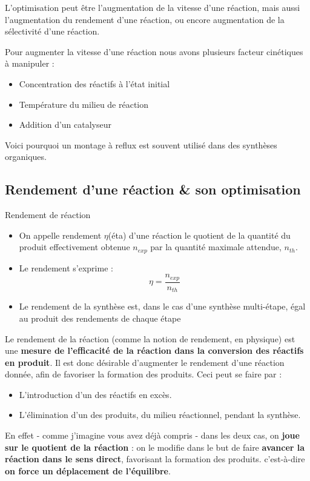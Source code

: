 \documentclass[11pt,a4paper]{article}
\begin{document}
L'optimisation peut être l'augmentation de la vitesse d'une réaction, mais aussi l'augmentation du rendement d'une réaction, ou encore augmentation de la sélectivité d'une réaction. 

Pour augmenter la vitesse d'une réaction nous avons plusieurs facteur cinétiques à manipuler : 
\begin{itemize}
    \item Concentration des réactifs à l'état initial
    \item Température du milieu de réaction
    \item Addition d'un catalyseur
\end{itemize}
Voici pourquoi un montage à reflux est souvent utilisé dans des synthèses organiques. 

\subsection{Rendement d'une réaction \& son optimisation}

\begin{defn}{Rendement de réaction }
\begin{itemize}
    \item On appelle rendement $\eta$(éta) d’une réaction le quotient de la quantité du produit effectivement obtenue $n_{exp}$  par la quantité maximale attendue, $n_{th}$.
    \item Le rendement s'exprime : \[ \eta = \frac{n_{exp}}{n_{th}} \]
    \item Le rendement de la synthèse est, dans le cas d’une synthèse multi-étape, égal au produit des rendements de chaque étape 
\end{itemize}
\end{defn}

Le rendement de la réaction (comme la notion de rendement, en physique) est une \textbf{mesure de l'efficacité de la réaction  dans la conversion des réactifs en produit}. Il est donc désirable d'augmenter le rendement d'une réaction donnée, afin de favoriser la formation des produits. Ceci peut se faire par :
\begin{itemize}
    \item L'introduction d'un des réactifs en excès. 
    \item L'élimination d'un des produits, du milieu réactionnel, pendant la synthèse. 
\end{itemize}
En effet - comme j'imagine vous avez déjà compris - dans les deux cas, on \textbf{joue sur le quotient de la réaction} : on le modifie dans le but de faire \textbf{avancer la réaction dans le sens direct}, favorisant la formation des produits. c'est-à-dire \textbf{on force un déplacement de l'équilibre}. 
\end{document}
